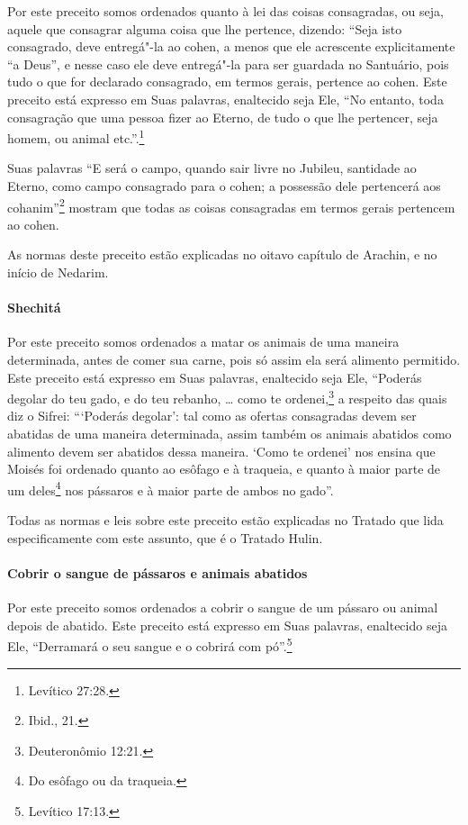 \begin{multicols}{2}
Por este preceito somos ordenados quanto à lei das coisas consagradas,
ou seja, aquele que consagrar alguma coisa que lhe pertence, dizendo:
``Seja isto consagrado, deve entregá"-la ao cohen\starr, a menos que ele
acrescente explicitamente ``a Deus'', e nesse caso ele deve entregá"-la
para ser guardada no Santuário, pois tudo o que for declarado
consagrado, em termos gerais, pertence ao cohen\starr. Este preceito está
expresso em Suas palavras, enaltecido seja Ele, ``No entanto, toda
consagração que uma pessoa fizer ao Eterno, de tudo o que lhe pertencer,
seja homem, ou animal etc.''.\footnote{Levítico 27:28.}

Suas palavras ``E será o campo, quando sair livre no Jubileu, santidade
ao Eterno, como campo consagrado para o cohen\starr; a possessão dele
pertencerá aos cohanim\starr''\footnote{Ibid., 21.} mostram que todas as coisas
consagradas em termos gerais pertencem ao cohen\starr.

As normas deste preceito estão explicadas no oitavo capítulo de
Arachin\starr, e no início de Nedarim\starr.

\paragraph{Shechitá\starr}

Por este preceito somos ordenados a matar os animais de uma maneira
determinada, antes de comer sua carne, pois só assim ela será alimento
permitido. Este preceito está expresso em Suas palavras, enaltecido seja
Ele, ``Poderás degolar do teu gado, e do teu rebanho, \ldots{} como te
ordenei,\footnote{Deuteronômio 12:21.} a respeito das quais diz o Sifrei\starr:
```Poderás degolar': tal como as ofertas consagradas devem ser abatidas
de uma maneira determinada, assim também os animais abatidos como
alimento devem ser abatidos dessa maneira. `Como te ordenei' nos ensina
que Moisés foi ordenado quanto ao esôfago e à traqueia, e quanto à maior
parte de um deles\footnote{Do esôfago ou da traqueia.} nos pássaros e à maior parte de
ambos no gado''.

Todas as normas e leis sobre este preceito estão explicadas no Tratado
que lida especificamente com este assunto, que é o Tratado Hulin\starr.

\paragraph{Cobrir o sangue de pássaros e animais abatidos}

Por este preceito somos ordenados a cobrir o sangue de um pássaro ou
animal depois de abatido. Este preceito está expresso em Suas palavras,
enaltecido seja Ele, ``Derramará o seu sangue e o cobrirá com pó''.\footnote{Levítico 17:13.}


\end{multicols}

